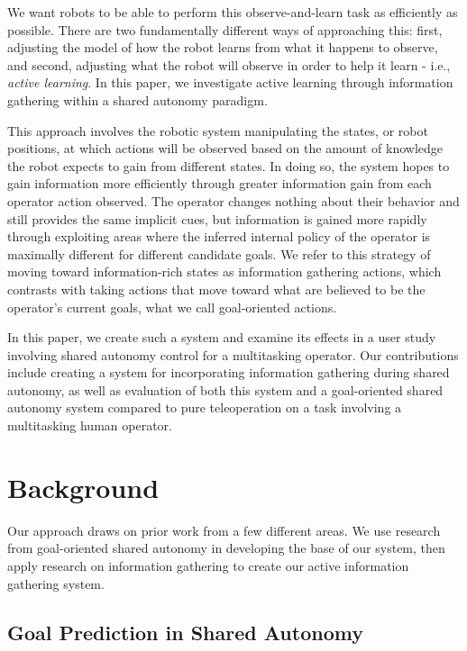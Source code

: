 \documentclass[conference]{IEEEtran}
\begin{document}
We want robots to be able to perform this observe-and-learn task as efficiently as possible. There are two fundamentally different ways of approaching this: first, adjusting the model of how the robot learns from what it happens to observe, and second, adjusting what the robot will observe in order to help it learn - i.e., \textit{active learning}. In this paper, we investigate active learning through information gathering within a shared autonomy paradigm.

This approach involves the robotic system manipulating the states, or robot positions, at which actions will be observed based on the amount of knowledge the robot expects to gain from different states. In doing so, the system hopes to gain information more efficiently through greater information gain from each operator action observed. The operator changes nothing about their behavior and still provides the same implicit cues, but information is gained more rapidly through exploiting areas where the inferred internal policy of the operator is maximally different for different candidate goals. We refer to this strategy of moving toward information-rich states as information gathering actions, which contrasts with taking actions that move toward what are believed to be the operator's current goals, what we call goal-oriented actions.

In this paper, we create such a system and examine its effects in a user study involving shared autonomy control for a multitasking operator. Our contributions include creating a system for incorporating information gathering during shared autonomy, as well as evaluation of both this system and a goal-oriented shared autonomy system compared to pure teleoperation on a task involving a multitasking human operator.

\section{Background}

Our approach draws on prior work from a few different areas. We use research from goal-oriented shared autonomy in developing the base of our system, then apply research on information gathering to create our active information gathering system.

\subsection{Goal Prediction in Shared Autonomy}
\end{document}
